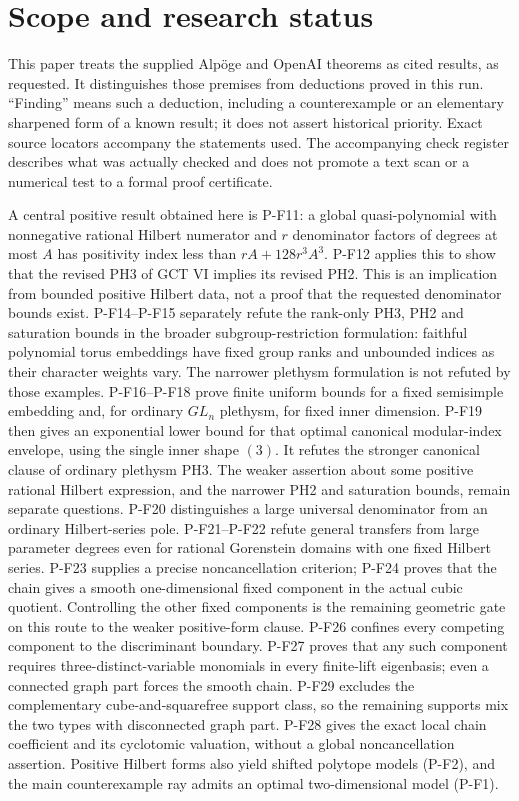 \section*{Scope and research status}
This paper treats the supplied Alp\"oge and OpenAI theorems as cited
results, as requested. It distinguishes those premises from deductions
proved in this run. ``Finding'' means such a deduction, including a
counterexample or an elementary sharpened form of a known result; it does
not assert historical priority. Exact source locators accompany the
statements used. The accompanying check register describes what was
actually checked and does not promote a text scan or a numerical test to
a formal proof certificate.

A central positive result obtained here is P-F11: a global
quasi-polynomial with nonnegative rational Hilbert numerator and
$r$ denominator factors of degrees at most $A$ has positivity index
less than $rA+128r^3A^3$. P-F12 applies this to show that the revised
PH3 of GCT VI implies its revised PH2. This is an implication from
bounded positive Hilbert data, not a proof that the requested
denominator bounds exist.
P-F14--P-F15 separately refute the rank-only PH3, PH2 and saturation
bounds in the broader subgroup-restriction formulation: faithful
polynomial torus embeddings have fixed group ranks and unbounded
indices as their character weights vary. The narrower plethysm
formulation is not refuted by those examples.
P-F16--P-F18 prove finite uniform bounds for a fixed semisimple
embedding and, for ordinary $GL_n$ plethysm, for fixed inner dimension.
P-F19 then gives an exponential lower bound for that optimal canonical
modular-index envelope, using the single inner shape $(3)$.
It refutes the stronger canonical clause of ordinary plethysm PH3.
The weaker assertion about some positive rational Hilbert expression,
and the narrower PH2 and saturation bounds, remain separate questions.
P-F20 distinguishes a large universal denominator from an ordinary
Hilbert-series pole. P-F21--P-F22 refute general transfers from large
parameter degrees even for rational Gorenstein domains with one fixed
Hilbert series. P-F23 supplies a precise noncancellation criterion;
P-F24 proves that the chain gives a smooth one-dimensional fixed
component in the actual cubic quotient. Controlling the other fixed
components is the remaining geometric gate on this route to the
weaker positive-form clause. P-F26 confines every competing component
to the discriminant boundary. P-F27 proves that any such component
requires three-distinct-variable monomials in every finite-lift
eigenbasis; even a connected graph part forces the smooth chain.
P-F29 excludes the complementary cube-and-squarefree support class,
so the remaining supports mix the two types with disconnected
graph part. P-F28 gives the exact local chain coefficient and its
cyclotomic valuation, without a global noncancellation assertion.
Positive Hilbert forms also yield
shifted polytope models (P-F2), and the main counterexample ray admits
an optimal two-dimensional model (P-F1).

